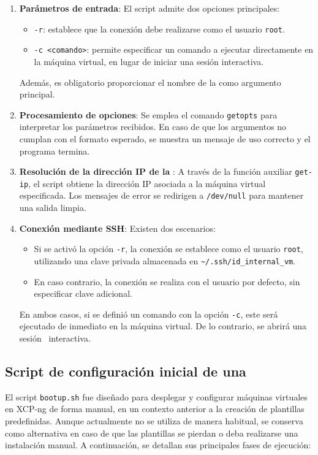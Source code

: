 \begin{enumerate}
    \item \textbf{Parámetros de entrada}:  
    El script admite dos opciones principales:
    \begin{itemize}
        \item \texttt{-r}: establece que la conexión debe realizarse como el usuario \texttt{root}.
        \item \texttt{-c <comando>}: permite especificar un comando a ejecutar directamente en la máquina virtual, en lugar de iniciar una sesión interactiva.
    \end{itemize}
    Además, es obligatorio proporcionar el nombre de la \VM como argumento principal.

    \item \textbf{Procesamiento de opciones}:  
    Se emplea el comando \texttt{getopts} para interpretar los parámetros recibidos. En caso de que los argumentos no cumplan con el formato esperado, se muestra un mensaje de uso correcto y el programa termina.

    \item \textbf{Resolución de la dirección IP de la \VM}:  
    A través de la función auxiliar \texttt{get-ip}, el script obtiene la dirección IP asociada a la máquina virtual especificada. Los mensajes de error se redirigen a \texttt{/dev/null} para mantener una salida limpia.

    \item \textbf{Conexión mediante SSH}:  
    Existen dos escenarios:
    \begin{itemize}
        \item Si se activó la opción \texttt{-r}, la conexión se establece como el usuario \texttt{root}, utilizando una clave privada almacenada en \texttt{\~{}/.ssh/id\_internal\_vm}.
        \item En caso contrario, la conexión se realiza con el usuario por defecto, sin especificar clave adicional.
    \end{itemize}
    En ambos casos, si se definió un comando con la opción \texttt{-c}, este será ejecutado de inmediato en la máquina virtual. De lo contrario, se abrirá una sesión \SSH\ interactiva.

\end{enumerate}



\subsection{Script de configuración inicial de una \VM}
\noindent
El script \texttt{bootup.sh} fue diseñado para desplegar y configurar máquinas virtuales en XCP-ng de forma manual, en un contexto anterior a la creación de plantillas predefinidas. Aunque actualmente no se utiliza de manera habitual, se conserva como alternativa en caso de que las plantillas se pierdan o deba realizarse una instalación manual. A continuación, se detallan sus principales fases de ejecución:

